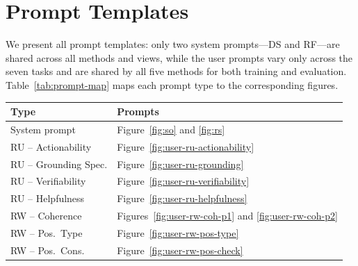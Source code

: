 \section{Prompt Templates}
\label{app:prompts}

We present all prompt templates: only two system prompts---DS and
RF---are shared across all methods and views, while the user prompts
vary only across the seven tasks and are shared by all five methods for
both training and evaluation.  Table~\ref{tab:prompt-map} maps each
prompt type to the corresponding figures.

\begin{center}
\small
\begin{tabularx}{\linewidth}{@{}lX@{}}
\toprule
\textbf{Type} & \textbf{Prompts} \\
\midrule
System prompt            & Figure~\ref{fig:so} and \ref{fig:rs} \\
RU -- Actionability      & Figure~\ref{fig:user-ru-actionability} \\
RU -- Grounding Spec.    & Figure~\ref{fig:user-ru-grounding} \\
RU -- Verifiability      & Figure~\ref{fig:user-ru-verifiability} \\
RU -- Helpfulness        & Figure~\ref{fig:user-ru-helpfulness} \\
RW -- Coherence          & Figures~\ref{fig:user-rw-coh-p1} and \ref{fig:user-rw-coh-p2} \\
RW -- Pos.\ Type         & Figure~\ref{fig:user-rw-pos-type} \\
RW -- Pos.\ Cons.        & Figure~\ref{fig:user-rw-pos-check} \\
\bottomrule
\end{tabularx}
\label{tab:prompt-map}
\end{center}




